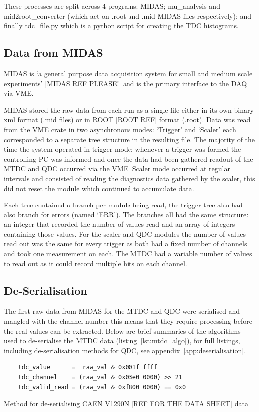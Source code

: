 \documentclass[]{article}
\begin{document}
These processes are split across 4 programs: MIDAS; mu\_analysis and mid2root\_converter (which act on .root and .mid MIDAS files respectively); and finally tdc\_file.py which is a python script for creating the TDC histograms.

\subsection{Data from MIDAS} %
\label{sub:data_from_midas}
MIDAS is `a general purpose data acquisition system for small and medium scale experiments' \ref{MIDAS REF PLEASE!} and is the primary interface to the DAQ via VME. 

MIDAS stored the raw data from each run as a single file either in its own binary xml format (.mid files) or in ROOT \ref{ROOT REF} format (.root). Data was read from the VME crate in two asynchronous modes: `Trigger' and `Scaler' each corresponded to a separate tree structure in the resulting file. The majority of the time the system operated in trigger-mode: whenever a trigger was formed the controlling PC was informed and once the data had been gathered readout of the MTDC and QDC occurred via the VME. Scaler mode occurred at regular intervals and consisted of reading the diagnostics data gathered by the scaler, this did not reset the module which continued to accumulate data. 

Each tree contained a branch per module being read, the trigger tree also had also branch for errors (named `ERR'). The branches all had the same structure: an integer that recorded the number of values read and an array of integers containing those values. For the scaler and QDC modules the number of values read out was the same for every trigger as both had a fixed number of channels and took one measurement on each. The MTDC had a variable number of values to read out as it could record multiple hits on each channel.
\subsection{De-Serialisation} %
\label{sub:de_serialisation}
The first raw data from MIDAS for the MTDC and QDC were serialised and mangled with the channel number this means that they require processing before the real values can be extracted. Below are brief summaries of the algorithms used to de-serialise the MTDC data (listing~\ref{lst:mtdc_algo}), for full listings, including de-serialisation methods for QDC, see appendix~\ref{app:deserialisation}.
%
\begin{listing}[htbp]
    \begin{verbatim}
    tdc_value      =  raw_val & 0x001f ffff
    tdc_channel    = (raw_val & 0x03e0 0000) >> 21
    tdc_valid_read = (raw_val & 0xf800 0000) == 0x0
    \end{verbatim}
    \caption{Method for de-serialising CAEN V1290N \ref{REF FOR THE DATA SHEET} data}
    \label{lst:mtdc_algo}
\end{listing}
\end{document}
